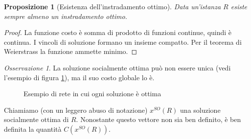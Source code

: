 \documentclass[a4paper]{article}
\theoremstyle{plain}
\newtheorem{mypro}[myteo]{Proposizione}
\theoremstyle{definition}
\theoremstyle{remark}
\newtheorem{myoss}[myteo]{Osservazione}
\newcommand{\pa}[1]{\left(#1\right)}
\begin{document}
\begin{mypro}[Esistenza dell'instradamento ottimo]
  Data un'istanza $R$ esiste sempre almeno un instradamento ottimo.
\end{mypro}
\begin{proof}
  La funzione costo \`e somma di prodotto di funzioni continue, quindi
  \`e continua. I vincoli di soluzione formano un insieme
  compatto. Per il teorema di Weierstrass la funzione ammette minimo.
\end{proof}
\begin{myoss}
  La soluzione socialmente ottima pu\`o non essere unica (vedi
  l'esempio di figura \ref{fig:esempio-so-nonunica}), ma il suo costo
  globale lo \`e.
\end{myoss}
\begin{figure}[ht]
  \centering
  \caption{Esempio di rete in cui ogni soluzione \`e ottima}
  \label{fig:esempio-so-nonunica}
\end{figure}

Chiamiamo (con un leggero abuso di notazione) $x^{SO}\pa{R}$ una
soluzione socialmente ottima di $R$. Nonostante questo vettore non sia
ben definito, \`e ben definita la quantit\`a $C\pa{x^{SO}\pa{R}}$.
\end{document}
